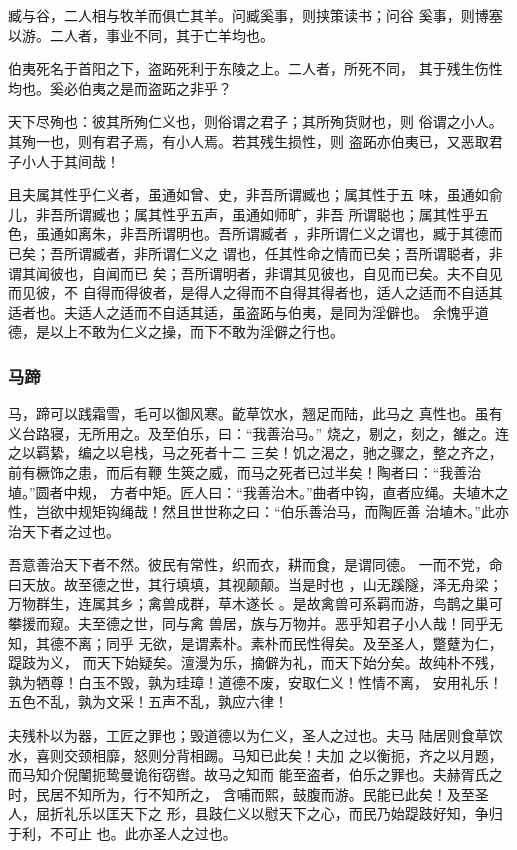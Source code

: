 \documentclass[]{article}
\begin{document}
臧与谷，二人相与牧羊而俱亡其羊。问臧奚事，则挟策读书；问谷
奚事，则博塞以游。二人者，事业不同，其于亡羊均也。

伯夷死名于首阳之下，盗跖死利于东陵之上。二人者，所死不同，
其于残生伤性均也。奚必伯夷之是而盗跖之非乎？

天下尽殉也：彼其所殉仁义也，则俗谓之君子；其所殉货财也，则
俗谓之小人。其殉一也，则有君子焉，有小人焉。若其残生损性，则
盗跖亦伯夷已，又恶取君子小人于其间哉！

且夫属其性乎仁义者，虽通如曾、史，非吾所谓臧也；属其性于五
味，虽通如俞儿，非吾所谓臧也；属其性乎五声，虽通如师旷，非吾
所谓聪也；属其性乎五色，虽通如离朱，非吾所谓明也。吾所谓臧者
，非所谓仁义之谓也，臧于其德而已矣；吾所谓臧者，非所谓仁义之
谓也，任其性命之情而已矣；吾所谓聪者，非谓其闻彼也，自闻而已
矣；吾所谓明者，非谓其见彼也，自见而已矣。夫不自见而见彼，不
自得而得彼者，是得人之得而不自得其得者也，适人之适而不自适其
适者也。夫适人之适而不自适其适，虽盗跖与伯夷，是同为淫僻也。
余愧乎道德，是以上不敢为仁义之操，而下不敢为淫僻之行也。

\hypertarget{header-n2103}{%
\subsubsection{马蹄}\label{header-n2103}}

马，蹄可以践霜雪，毛可以御风寒。齕草饮水，翘足而陆，此马之
真性也。虽有义台路寝，无所用之。及至伯乐，曰：``我善治马。''
烧之，剔之，刻之，雒之。连之以羁絷，编之以皂栈，马之死者十二
三矣！饥之渴之，驰之骤之，整之齐之，前有橛饰之患，而后有鞭
生筴之威，而马之死者已过半矣！陶者曰：``我善治埴。''圆者中规，
方者中矩。匠人曰：``我善治木。''曲者中钩，直者应绳。夫埴木之
性，岂欲中规矩钩绳哉！然且世世称之曰：``伯乐善治马，而陶匠善
治埴木。''此亦治天下者之过也。

吾意善治天下者不然。彼民有常性，织而衣，耕而食，是谓同德。
一而不党，命曰天放。故至德之世，其行填填，其视颠颠。当是时也
，山无蹊隧，泽无舟梁；万物群生，连属其乡；禽兽成群，草木遂长
。是故禽兽可系羁而游，鸟鹊之巢可攀援而窥。夫至德之世，同与禽
兽居，族与万物并。恶乎知君子小人哉！同乎无知，其德不离；同乎
无欲，是谓素朴。素朴而民性得矣。及至圣人，蹩躠为仁，踶跂为义，
而天下始疑矣。澶漫为乐，摘僻为礼，而天下始分矣。故纯朴不残，
孰为牺尊！白玉不毁，孰为珪璋！道德不废，安取仁义！性情不离，
安用礼乐！五色不乱，孰为文采！五声不乱，孰应六律！

夫残朴以为器，工匠之罪也；毁道德以为仁义，圣人之过也。夫马
陆居则食草饮水，喜则交颈相靡，怒则分背相踢。马知已此矣！夫加
之以衡扼，齐之以月题，而马知介倪闉扼鸷曼诡衔窃辔。故马之知而
能至盗者，伯乐之罪也。夫赫胥氏之时，民居不知所为，行不知所之，
含哺而熙，鼓腹而游。民能已此矣！及至圣人，屈折礼乐以匡天下之
形，县跂仁义以慰天下之心，而民乃始踶跂好知，争归于利，不可止
也。此亦圣人之过也。
\end{document}
